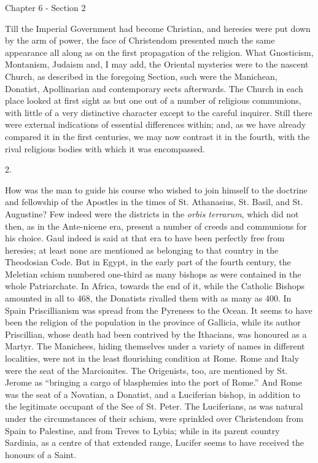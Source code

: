 Chapter 6 - Section 2


Till the Imperial Government had become Christian, and
heresies were put down by the arm of power, the face of
Christendom presented much the same appearance all along
as on the first propagation of the religion. What
Gnosticism, Montanism, Judaism and, I may add, the
Oriental mysteries were to the nascent Church, as
described in the foregoing Section, such were the
Manichean, Donatist, Apollinarian and contemporary sects
afterwards. The Church in each place looked at first
sight as but one out of a number of religious communions,
with little of a very distinctive character except to the
careful inquirer. Still there were external indications
of essential differences within; and, as we have already
compared it in the first centuries, we may now contrast
it in the fourth, with the rival religious bodies with
which it was encompassed.

2.

How was the man to guide his course who wished to join
himself to the doctrine and fellowship of the Apostles in
the times of St. Athanasius, St. Basil, and St.
Augustine? Few indeed were the districts in the \emph{orbis
terrarum}, which did not then, as in the Ante-nicene
era, present a number of creeds and communions for his
choice. Gaul indeed is said at that era to have been
perfectly free from heresies; at least none are mentioned
as belonging to that country in the Theodosian Code. But
in Egypt, in the early part of the fourth century, the
Meletian schism numbered one-third as many bishops as
were contained in the whole Patriarchate. In Africa,
towards the end of it, while the Catholic Bishops
amounted in all to 468, the Donatists rivalled them with
as many as 400. In Spain Priscillianism was spread from
the Pyrenees to the Ocean. It seems to have been the
religion of the population in the province of Gallicia,
while its author Priscillian, whose death had been
contrived by the Ithacians, was honoured as a Martyr. The
Manichees, hiding themselves under a variety of names in
different localities, were not in the least flourishing
condition at Rome. Rome and Italy were the seat of the
Marcionites. The Origenists, too, are mentioned by St.
Jerome as ``bringing a cargo of blasphemies into the
port of Rome.'' And Rome was the seat of a Novatian,
a Donatist, and a Luciferian bishop, in addition to the
legitimate occupant of the See of St. Peter. The
Luciferians, as was natural under the circumstances of
their schism, were sprinkled over Christendom from Spain
to Palestine, and from Treves to Lybia; while in its
parent country Sardinia, as a centre of that extended
range, Lucifer seems to have received the honours of a
Saint.

